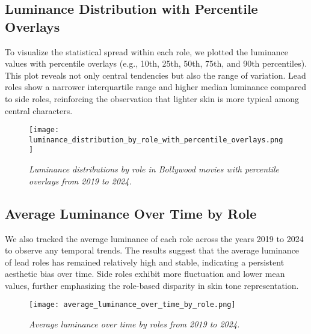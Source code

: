 \subsection{Luminance Distribution with Percentile Overlays}
To visualize the statistical spread within each role, we plotted the luminance values with percentile overlays (e.g., 10th, 25th, 50th, 75th, and 90th percentiles). This plot reveals not only central tendencies but also the range of variation. Lead roles show a narrower interquartile range and higher median luminance compared to side roles, reinforcing the observation that lighter skin is more typical among central characters.
\begin{figure}[!htpb]
    \centering
    \texttt{[image: luminance\_distribution\_by\_role\_with\_percentile\_overlays.png]}
    \caption{\textit{Luminance distributions by role in Bollywood movies with percentile overlays from 2019 to 2024.}}
    \label{fig: Luminance percentile overlays by Role}
\end{figure}

\subsection{Average Luminance Over Time by Role}
We also tracked the average luminance of each role across the years 2019 to 2024 to observe any temporal trends. The results suggest that the average luminance of lead roles has remained relatively high and stable, indicating a persistent aesthetic bias over time. Side roles exhibit more fluctuation and lower mean values, further emphasizing the role-based disparity in skin tone representation.
\begin{figure}[!htpb]
    \centering
    \texttt{[image: average\_luminance\_over\_time\_by\_role.png]}
    \caption{\textit{Average luminance over time by roles from 2019 to 2024.}}
    \label{fig: Luminance average by Role}
\end{figure}

